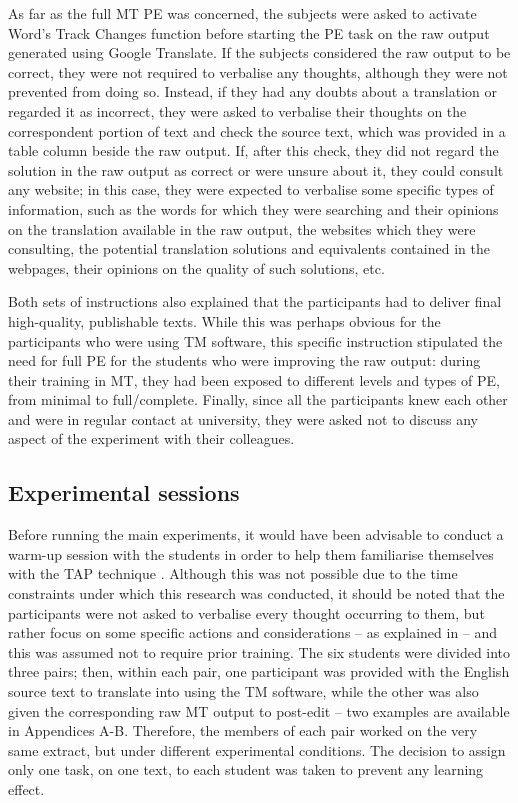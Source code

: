 \documentclass[output=paper]{LSP/langsci}
\begin{document}
\newpage
As far as the full MT PE was concerned, the subjects were asked to activate Word's Track Changes function before starting the PE task on the raw output generated using Google Translate. If the subjects considered the raw output to be correct, they were not required to verbalise any thoughts, although they were not prevented from doing so. Instead, if they had any doubts about a translation or regarded it as incorrect, they were asked to verbalise their thoughts on the correspondent portion of text and check the source text, which was provided in a table column beside the raw output. If, after this check, they did not regard the solution in the raw output as correct or were unsure about it, they could consult any website; in this case, they were expected to verbalise some specific types of information, such as the words for which they were searching and their opinions on the translation available in the raw output, the websites which they were consulting, the potential translation solutions and equivalents contained in the webpages, their opinions on the quality of such solutions, etc.

Both sets of instructions also explained that the participants had to deliver final high-quality, publishable texts. While this was perhaps obvious for the participants who were using TM software, this specific instruction stipulated the need for full PE for the students who were improving the raw output: during their training in MT, they had been exposed to different levels and types of PE, from minimal to full/complete. Finally, since all the participants knew each other and were in regular contact at university, they were asked not to discuss any aspect of the experiment with their colleagues.


\subsection{Experimental sessions}\label{ressetti-gaspari:sec:3.4}


Before running the main experiments, it would have been advisable to conduct a warm-up session with the students in order to help them familiarise themselves with the TAP technique \citep{OBrien2010a}. Although this was not possible due to the time constraints under which this research was conducted, it should be noted that the participants were not asked to verbalise every thought occurring to them, but rather focus on some specific actions and considerations -- as explained in  -- and this was assumed not to require prior training. The six students were divided into three pairs; then, within each pair, one participant was provided with the English source text to translate into  using the TM software, while the other was also given the corresponding  raw MT output to post-edit -- two examples are available in Appendices A-B. Therefore, the members of each pair worked on the very same extract, but under different experimental conditions. The decision to assign only one task, on one text, to each student was taken to prevent any learning effect.
\end{document}
